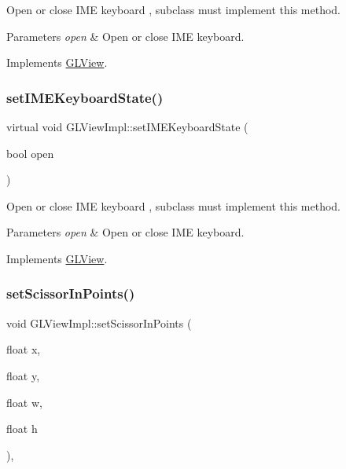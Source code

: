 Open or close I\+ME keyboard , subclass must implement this method.


\begin{DoxyParams}{Parameters}
{\em open} & Open or close I\+ME keyboard. \\
\hline
\end{DoxyParams}


Implements \hyperlink{classGLView_aaa70edad9dd4b2052237867db978e06d}{G\+L\+View}.

\mbox{\label{classGLViewImpl_a97c906321e44204249b112de5706a617}} 
\subsubsection{\texorpdfstring{set\+I\+M\+E\+Keyboard\+State()}{setIMEKeyboardState()}\hspace{0.1cm}{\footnotesize\ttfamily [9/9]}}
{\footnotesize\ttfamily virtual void G\+L\+View\+Impl\+::set\+I\+M\+E\+Keyboard\+State (\begin{DoxyParamCaption}\item[{bool}]{open }\end{DoxyParamCaption})\hspace{0.3cm}{\ttfamily [virtual]}}

Open or close I\+ME keyboard , subclass must implement this method.


\begin{DoxyParams}{Parameters}
{\em open} & Open or close I\+ME keyboard. \\
\hline
\end{DoxyParams}


Implements \hyperlink{classGLView_aaa70edad9dd4b2052237867db978e06d}{G\+L\+View}.

\mbox{\label{classGLViewImpl_a76dc10b4cab007815628df12ac037bde}} 
\subsubsection{\texorpdfstring{set\+Scissor\+In\+Points()}{setScissorInPoints()}\hspace{0.1cm}{\footnotesize\ttfamily [1/2]}}
{\footnotesize\ttfamily void G\+L\+View\+Impl\+::set\+Scissor\+In\+Points (\begin{DoxyParamCaption}\item[{float}]{x,  }\item[{float}]{y,  }\item[{float}]{w,  }\item[{float}]{h }\end{DoxyParamCaption})\hspace{0.3cm}{\ttfamily [override]}, {\ttfamily [virtual]}}

